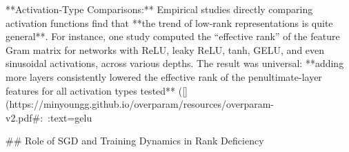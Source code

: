 **Activation-Type Comparisons:** Empirical studies directly comparing activation functions find that **the trend of low-rank representations is quite general**. For instance, one study computed the “effective rank” of the feature Gram matrix for networks with ReLU, leaky ReLU, tanh, GELU, and even sinusoidal activations, across various depths. The result was universal: **adding more layers consistently lowered the effective rank of the penultimate-layer features for all activation types tested** ([](https://minyoungg.github.io/overparam/resources/overparam-v2.pdf#:~:text=gelu%

## Role of SGD and Training Dynamics in Rank Deficiency

